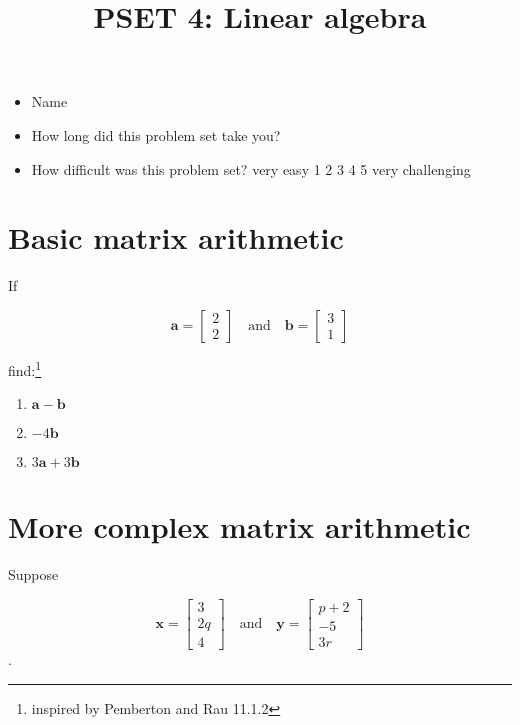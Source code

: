 \documentclass[
]{article}
\title{PSET 4: Linear algebra}
\author{}
\date{\vspace{-2.5em}}
\begin{document}
\maketitle

\begin{itemize}
\item
  Name
\item
  How long did this problem set take you?
\item
  How difficult was this problem set? very easy 1 2 3 4 5 very
  challenging
\end{itemize}

\section{Basic matrix arithmetic}\label{basic-matrix-arithmetic}

If

\[\mathbf{a} = \begin{bmatrix}
    2 \\
    2
\end{bmatrix} \quad \mbox{and} \quad \mathbf{b} = \begin{bmatrix}
    3 \\
    1
\end{bmatrix}\]

find:\footnote{inspired by Pemberton and Rau 11.1.2}

\begin{enumerate}
\def\labelenumi{\alph{enumi}.}
\item
  \(\mathbf{a} - \mathbf{b}\)
\item
  \(-4 \mathbf{b}\)
\item
  \(3 \mathbf{a} +3 \mathbf{b}\)
\end{enumerate}

\section{More complex matrix
arithmetic}\label{more-complex-matrix-arithmetic}

Suppose

\[\mathbf{x} = \begin{bmatrix}
    3 \\
    2q \\
    4
\end{bmatrix} \quad \mbox{and} \quad \mathbf{y} = \begin{bmatrix}
    p + 2 \\
    -5 \\
    3r
\end{bmatrix}\].
\end{document}

